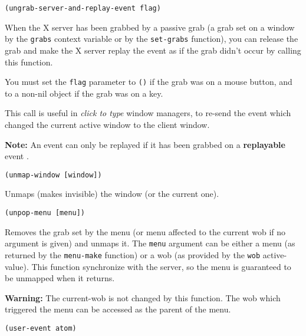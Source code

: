 
{\usagefont\begin{verbatim}
(ungrab-server-and-replay-event flag)
\end{verbatim}}\usageupspace

When the X server has been grabbed by a passive grab (a grab set on a
window by the \verb"grabs" context variable or by the \verb"set-grabs"
function), you can release the grab and make the X server replay the event
as if the grab didn't occur by calling this function.

You must set the \verb"flag" parameter to \verb"()" if the grab was on a
mouse button, and to a non-nil object if the grab was on a key.

This call is useful in {\em click to type} window managers, to re-send the
event which changed the current active window to the client window.

{\bf Note:} An event can only be replayed if it has been grabbed on a
{\bf replayable} event .

        
{\usagefont\begin{verbatim}
(unmap-window [window])
\end{verbatim}}\usageupspace

Unmaps (makes invisible) the window (or the current one).

        
{\usagefont\begin{verbatim}
(unpop-menu [menu])
\end{verbatim}}\usageupspace

Removes the grab set by the menu (or menu affected to the current wob if no
argument is given) and unmaps it. The {\tt menu} argument can be either a
menu (as returned by the \verb"menu-make" function) or a wob (as provided by
the \verb"wob" active-value). This function synchronize {\GWM} with the
server, so the menu is guaranteed to be unmapped when it returns.

{\bf Warning:} The current-wob is not changed by this function. The wob
which triggered the menu can be accessed as the parent of the menu.

        
{\usagefont\begin{verbatim}
(user-event atom)
\end{verbatim}}\usageupspace


